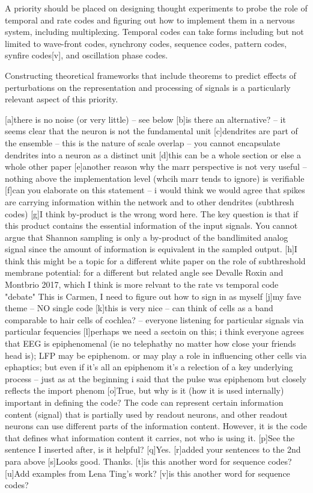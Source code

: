 \documentclass[12pt]{article}
\begin{document}
A priority should be placed on designing thought experiments to probe the role of temporal and rate codes and figuring out how to implement them in a nervous system, including
multiplexing. Temporal codes can take forms including but not limited to wave-front codes, synchrony codes, sequence codes, pattern codes, synfire codes[v], and oscillation
phase codes.

Constructing theoretical frameworks that include theorems to predict effects of perturbations on the representation and processing of signals is a particularly relevant aspect
of this priority.

[a]there is no noise (or very little) -- see below
[b]is there an alternative? -- it seems clear that the neuron is not the fundamental unit
[c]dendrites are part of the ensemble -- this is the nature of scale overlap -- you cannot encapsulate dendrites into a neuron as a distinct unit
[d]this can be a whole section or else a whole other paper
[e]another reason why the marr perspective is not very useful -- nothing above the implementation level (whcih marr tends to ignore) is verifiable
[f]can you elaborate on this statement -- i would think we would agree that spikes are carrying information within the network and to other dendrites (subthresh codes)
[g]I think by-product is the wrong word here. The key question is that if this product contains the essential information of the input signals. You cannot argue that Shannon sampling is only a by-product of the bandlimited analog signal since the amount of information is equivalent in the sampled output.
[h]I think this might be a topic for a different white paper on the role of subthreshold membrane potential: for a different but related angle see Devalle Roxin and Montbrio 2017, which I think is more relvant to the rate vs temporal code "debate"
This is Carmen, I need to figure out how to sign in as myself
[j]my fave theme -- NO single code
[k]this is very nice -- can think of cells as a band comparable to hair cells of cochlea? -- everyone listening for particular signals via particular fequencies
[l]perhaps we need a sectoin on this;  i think everyone agrees that EEG is epiphenomenal (ie no telephathy no matter how close your friends head is);  LFP may be epiphenom. or may play a role in influencing other cells via ephaptics; but even if it's all an epiphenom it's a relection of a key underlying process -- just as at the beginning i said that the pulse was epiphenom but closely reflects the import phenom
[o]True, but why is it (how it is used internally) important in defining the code? The code can represent certain information content (signal) that is partially used by readout neurons, and other readout neurons can use different parts of the information content. However, it is the code that defines what information content it carries, not who is using it.
[p]See the sentence I inserted after, is it helpful?
[q]Yes.
[r]added your sentences to the 2nd  para above
[s]Looks good. Thanks.
[t]is this another word for sequence codes?
[u]Add examples from Lena Ting’s work?
[v]is this another word for sequence codes?


\end{document}
